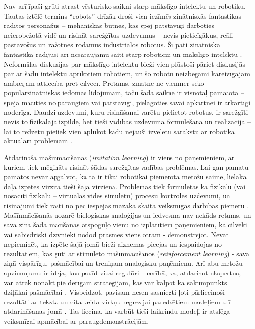 \documentclass[12pt, a4paper]{article}
\numberwithin{equation}{section} %
\begin{document}
Nav arī īpaši grūti atrast vēsturisko saikni starp mākslīgo intelektu un robotiku. Tautas iztēlē termins ``robots'' drīzāk droši vien iezīmēs zinātniskās fantastikas radītos personāžus -- mehāniskas būtnes, kas spēj patstāvīgi darboties neierobežotā vidē un risināt sarežģītus uzdevumus -- nevis pieticīgākus, reāli pastāvošus un ražotnēs rodamus industriālos robotus. Šī pati zinātniskā fantastika radījusi arī nesaraujamu saiti starp robotiem un mākslīgo intelektu \cite{asimov2004robot}. Neformālas diskusijas par mākslīgo intelektu bieži vien plūstoši pāriet diskusijās par ar šādu intelektu aprīkotiem robotiem, un šo robotu neizbēgami kareivīgajām ambīcijām attiecībā pret cilvēci. Protams, zinātne ne vienmēr seko populārzinātniskās iedomas lidojumam, taču šāda saikne ir visnotaļ pamatota -- spēja mācīties no paraugiem vai patstāvīgi, pielāgoties savai apkārtnei ir ārkārtīgi noderīga. Daudzi uzdevumi, kuru risināšanai varētu pielietot robotus, ir sarežģīti nevis to fizikālajā izpildē, bet tieši vadības uzdevuma formulēšanā un realizācijā -- lai to redzētu pietiek vien aplūkot kādu nejauši izvēlētu sarakstu ar robotikā aktuālām problēmām \cite{popsci}.

Atdarinošā mašīnmācīšanās (\textit{imitation learning}) ir viens no paņēmieniem, ar kuriem tiek mēģināts risināt šādas sarežģītas vadības problēmas. Lai gan pamatu pamatos nevar apgalvot, ka tā ir tikai robotikai piemērota metožu saime, lielākā daļa izpētes virzīta tieši šajā virzienā. Problēmas tiek formulētas kā fizikālu (vai nosacīti fizikālu -- virtuālās vidēs simulētu) procesu kontroles uzdevumi, un risinājumi tiek rasti no pēc iespējas mazāka skaita veiksmīgas darbības piemēru \cite{attia2018global}. Mašīnmācīšanās nozarē bioloģiskas analoģijas un iedvesma nav nekāds retums, un savā ziņā šāda mācīšanās  atspoguļo vienu no izplatītiem paņēmieniem, kā cilvēki vai sabiedriski dzīvnieki nodod prasmes viens otram - demonstrējot. Nevar nepieminēt, ka izpēte šajā jomā bieži aizņemas pieejas un iespaidojas no rezultātiem, kas gūti ar stimulēto mašīnmācīšanos (\textit{reinforcement learning}) - savā ziņā vispārīgu, pašmācībai un treniņam analoģisku paņēmienu. Arī abu metožu apvienojums ir ideja, kas pavīd visai regulāri -- cerībā, ka, atdarinot ekspertus, var ātrāk nonākt pie derīgām stratēģijām, kas var kalpot kā sākumpunkts dziļākai pašmācībai \cite{hester2018deep}. Visbeidzot, pavisam nesen sasniegti ļoti pārliecinoši rezultāti ar teksta un cita veida virkņu regresijai paredzētiem modeļiem arī atdarināšanas jomā \cite{reed2022generalist}. Tas liecina, ka varbūt tieši laikrindu modeļi ir atslēga veiksmīgai apmācībai ar paraugdemonstrācijām.
\end{document}
